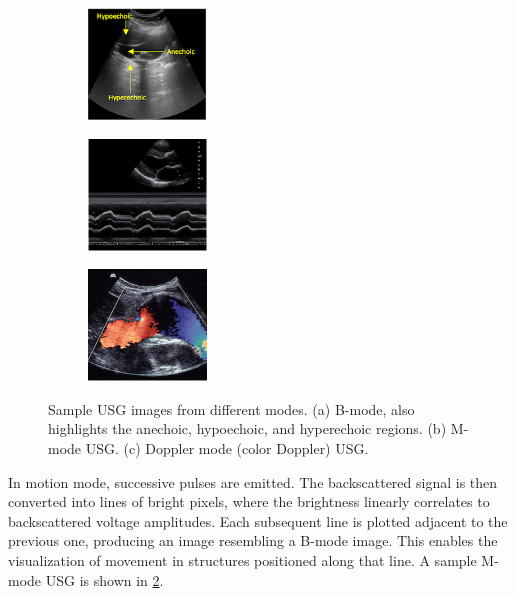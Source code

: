 \begin{figure}[!t]
\centering
	\begin{subfigure}[b]{0.32\linewidth}
	\centering
	\includegraphics[width=\linewidth, height=8em]{figs/b_mode.png}
		\caption{}
		\label{fig:b_mode}
	\end{subfigure}
	\begin{subfigure}[b]{0.32\linewidth}
	\centering
	\includegraphics[width=\linewidth, height=8em]{figs/m_mode.png}
		\caption{}
		\label{fig:m_mode}
	\end{subfigure}
        \begin{subfigure}[b]{0.32\linewidth}
	\centering
	\includegraphics[width=\linewidth, height=8em]{figs/d_mode.png}
		\caption{}
		\label{fig:d_mode}
	\end{subfigure}
	\caption[Sample USG images from different modes]{Sample USG images from different modes. (a) B-mode, also highlights the anechoic, hypoechoic, and hyperechoic regions. (b) M-mode USG. (c) Doppler mode (color Doppler) USG.}
    \label{fig:usg_modes}
\end{figure}

%
In motion mode, successive pulses are emitted. The backscattered signal is then converted into lines of bright pixels, where the brightness linearly correlates to backscattered voltage amplitudes. Each subsequent line is plotted adjacent to the previous one, producing an image resembling a B-mode image. This enables the visualization of movement in structures positioned along that line. A sample M-mode USG is shown in \cref{fig:m_mode}.

